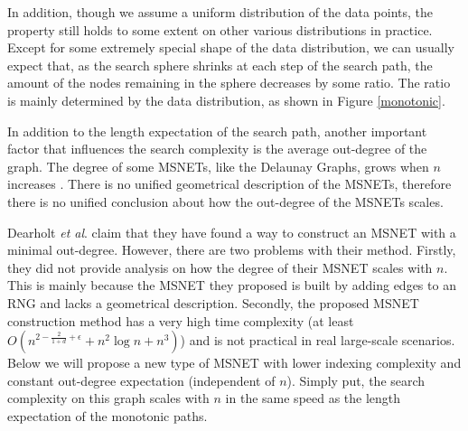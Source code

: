 \documentclass{vldb}
\def\etal{\emph{et al}.}
\begin{document}
In addition, though we assume a uniform distribution of the data points, the property still holds to some extent on other various distributions in practice. Except for some extremely special shape of the data distribution, we can usually expect that, as the search sphere shrinks at each step of the search path, the amount of the nodes remaining in the sphere decreases by some ratio. The ratio is mainly determined by the data distribution, as shown in Figure \ref{monotonic}.


In addition to the length expectation of the search path, another important factor that influences the search complexity is the average out-degree of the graph. The degree of some MSNETs, like the Delaunay Graphs, grows when $n$ increases \cite{aurenhammer1991voronoi}. There is no unified geometrical description of the MSNETs, therefore there is no unified conclusion about how the out-degree of the MSNETs scales. 

Dearholt \etal \cite{dearholt1988monotonic} claim that they have found a way to construct an MSNET with a minimal out-degree. However, there are two problems with their method. Firstly, they did not provide analysis on how the degree of their MSNET scales with $n$. This is mainly because the MSNET they proposed is built by adding edges to an RNG and lacks a geometrical description. Secondly, the proposed MSNET construction method has a very high time complexity (at least $O(n^{2-\frac{2}{1+d} +\epsilon} + n^2\log n + n^3)$) and is not practical in real large-scale scenarios. Below we will propose a new type of MSNET with lower indexing complexity and constant out-degree expectation (independent of $n$). Simply put, the search complexity on this graph scales with $n$ in the same speed as the length expectation of the monotonic paths.
\end{document}
